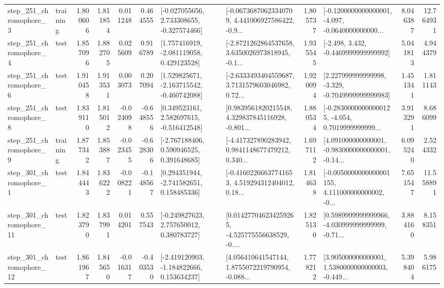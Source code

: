 \begin{tabular}{llrrrrllrlrr}
   step\_251\_chromophore\_3 &  training &      1.800606 &    1.811854 &      0.011248 &  0.464555 &   [-0.027055656, 2.733308655, -0.327574466] &  [-0.06736870623340709, 4.441006927586422, -0.9... &       1.805737 &  [-0.1200000000000001, -4.097, -0.0640000000000... &            8.046387 &         12.764931 \\
   step\_251\_chromophore\_4 &      test &      1.857096 &    1.882705 &      0.025609 &  0.916789 &    [1.757416919, -2.081119058, 0.429123528] &  [-2.8721262864537658, 3.6350026973818945, -0.1... &       1.935545 &               [-2.498, 3.432, -0.4469999999999992] &            5.041813 &          4.944379 \\
   step\_251\_chromophore\_6 &      test &      1.910458 &    1.913531 &      0.003073 &  0.207094 &   [1.529825671, -2.163715542, -0.460742088] &  [-2.6333493404559687, 3.7131579603046982, 0.72... &       1.920094 &   [2.227999999999998, -3.329, -0.7049999999999983] &            1.451341 &          1.811143 \\
   step\_251\_chromophore\_8 &      test &      1.839110 &    1.815012 &     -0.024098 & -0.648556 &    [0.349523161, 2.582697615, -0.516412548] &  [0.9839561820215548, 4.329837845116928, -0.801... &       1.880534 &  [-0.28300000000000125, -4.054, 0.7019999999999... &            3.913291 &          8.686099 \\
   step\_251\_chromophore\_9 &  training &      1.877342 &    1.853887 &     -0.023455 & -0.628306 &    [-2.767188406, 0.590946525, 0.391648685] &  [-4.417327890283942, 0.9841148677479212, 0.340... &       1.697112 &  [4.091000000000001, -0.9830000000000001, -0.14... &            6.095240 &          2.524332 \\
   step\_301\_chromophore\_1 &      test &      1.844443 &    1.836222 &     -0.008221 & -0.148567 &    [0.294351944, -2.741582651, 0.158485336] &  [-0.41602266637741653, 4.519294312404012, 0.18... &       1.814638 &  [-0.0050000000000001155, 4.111000000000002, -0... &            7.651547 &         11.558891 \\
  step\_301\_chromophore\_11 &      test &      1.823790 &    1.837991 &      0.014201 &  0.557543 &    [-0.249827623, 2.757650012, 0.380783727] &  [0.014277046234259265, -4.525775556638529, -0.... &       1.825130 &  [0.5989999999999966, -4.030999999999999, -0.71... &            3.884160 &          8.158351 \\
  step\_301\_chromophore\_12 &      test &      1.861967 &    1.845650 &     -0.016317 & -0.403530 &   [-2.419120903, -1.184822666, 0.153634237] &  [4.056410641547144, 1.8755072219790954, -0.088... &       1.778212 &  [3.905000000000001, 1.5380000000000003, -0.449... &            5.398404 &          5.986175 \\

\end{tabular}
